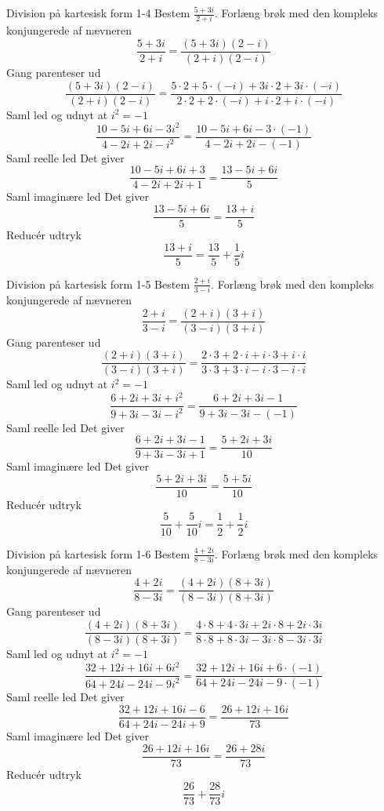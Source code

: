\documentclass{article}
\begin{document}
\newpage
\begin{exercise}{Division på kartesisk form 1-4}
Bestem $\frac{5 + 3i}{2 + i}$.
\hint
Forlæng brøk med den kompleks konjungerede af nævneren
\[\frac{5 + 3i}{2 + i} = \frac{(5 + 3i)(2 - i)}{(2 + i)(2 - i)}
\]
\hint
Gang parenteser ud
\[\frac{(5 + 3i)(2 - i)}{(2 + i)(2 - i)} = \frac{5 \cdot 2 + 5 \cdot (-i) + 3i \cdot 2 + 3i \cdot (-i)}{2 \cdot 2 + 2 \cdot (-i) + i \cdot 2 + i \cdot (-i)}
\]
\hint
Saml led og udnyt at $i^2 = - 1$
\[\frac{10 - 5i + 6i - 3i^2}{4 - 2i + 2i - i^2} = \frac{10 - 5i + 6i - 3 \cdot (-1)}{4 - 2i + 2i - (-1)}
\]
\hint
Saml reelle led
\hint
Det giver
\[\frac{10 - 5i + 6i + 3}{4 - 2i + 2i + 1} = \frac{13 - 5i + 6i}{5}
\]
\hint
Saml imaginære led
\hint
Det giver
\[\frac{13 - 5i + 6i}{5} = \frac{13 + i}{5}
\]
\hint
Reducér udtryk
\[\frac{13 + i}{5} = \frac{13}{5} + \frac{1}{5}i
\]
\end{exercise}
\newpage
\begin{exercise}{Division på kartesisk form 1-5}
Bestem $\frac{2 + i}{3 - i}$.
\hint
Forlæng brøk med den kompleks konjungerede af nævneren
\[\frac{2 + i}{3 - i} = \frac{(2 + i)(3 + i)}{(3 - i)(3 + i)}
\]
\hint
Gang parenteser ud
\[\frac{(2 + i)(3 + i)}{(3 - i)(3 + i)} = \frac{2 \cdot 3 + 2 \cdot i + i \cdot 3 + i \cdot i}{3 \cdot 3 + 3 \cdot i - i \cdot 3 - i \cdot i}
\]
\hint
Saml led og udnyt at $i^2 = - 1$
\[\frac{6 + 2i + 3i + i^2}{9 + 3i - 3i - i^2} = \frac{6 + 2i + 3i - 1}{9 + 3i - 3i - (-1)}
\]
\hint
Saml reelle led
\hint
Det giver
\[\frac{6 + 2i + 3i - 1}{9 + 3i - 3i + 1} = \frac{5 + 2i + 3i}{10}
\]
\hint
Saml imaginære led
\hint
Det giver
\[\frac{5 + 2i + 3i}{10} = \frac{5 + 5i}{10}
\]
\hint
Reducér udtryk
\[\frac{5}{10} + \frac{5}{10}i = \frac{1}{2} + \frac{1}{2}i
\]
\end{exercise}
\newpage
\begin{exercise}{Division på kartesisk form 1-6}
Bestem $\frac{4 + 2i}{8 - 3i}$.
\hint
Forlæng brøk med den kompleks konjungerede af nævneren
\[\frac{4 + 2i}{8 - 3i} = \frac{(4 + 2i)(8 + 3i)}{(8 - 3i)(8 + 3i)}
\]
\hint
Gang parenteser ud
\[\frac{(4 + 2i)(8 + 3i)}{(8 - 3i)(8 + 3i)} = \frac{4 \cdot 8 + 4 \cdot 3i + 2i \cdot 8 + 2i \cdot 3i}{8 \cdot 8 + 8 \cdot 3i - 3i \cdot 8 - 3i \cdot 3i}
\]
\hint
Saml led og udnyt at $i^2 = - 1$
\[\frac{32 + 12i + 16i + 6i^2}{64 + 24i - 24i - 9i^2} = \frac{32 + 12i + 16i + 6 \cdot (-1)}{64 + 24i - 24i - 9 \cdot (-1)}
\]
\hint
Saml reelle led
\hint
Det giver
\[\frac{32 + 12i + 16i - 6}{64 + 24i - 24i + 9 } = \frac{26 + 12i + 16i}{73}
\]
\hint
Saml imaginære led
\hint
Det giver
\[\frac{26 + 12i + 16i}{73} = \frac{26 + 28i}{73}
\]
\hint
Reducér udtryk
\[\frac{26}{73} + \frac{28}{73}i
\]
\end{exercise}
\end{document}
